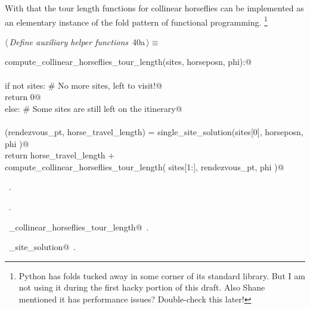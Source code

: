 \documentclass[11.5pt]{report}
\begin{document}
\vspace{-0.8cm}
With that the tour length functions for collinear horseflies can be implemented as 
an elementary instance of the fold pattern of functional programming. 
\footnote{Python has folds tucked away in some corner of its standard library. 
But I am not using it during the first hacky portion of this draft. Also Shane 
mentioned it has performance issues? Double-check this later!}
\begin{flushleft} \small\label{scrap44}\raggedright\small
{} $\langle\,${\itshape Define auxiliary helper functions}\nobreak\ {\footnotesize {40a}}$\,\rangle\equiv$
\vspace{-1ex}
\begin{list}{}{} \item
\mbox{}\verb@def compute_collinear_horseflies_tour_length(sites, horseposn, phi):@\\
\mbox{}\verb@@\\
\mbox{}\verb@     if not sites: # No more sites, left to visit!@\\
\mbox{}\verb@          return 0@\\
\mbox{}\verb@     else:         # Some sites are still left on the itinerary@\\
\mbox{}\verb@@\\
\mbox{}\verb@          (rendezvous_pt, horse_travel_length) = single_site_solution(sites[0], horseposn, phi )@\\
\mbox{}\verb@          return horse_travel_length  + \@\\
\mbox{}\verb@                 compute_collinear_horseflies_tour_length( sites[1:], rendezvous_pt, phi )@\\
\mbox{}\verb@@{\NWsep}
\end{list}
\vspace{-1.5ex}
\footnotesize
\begin{list}{}{\setlength{\itemsep}{-\parsep}\setlength{\itemindent}{-\leftmargin}}
\item \NWtxtMacroDefBy\ .
\item \NWtxtMacroRefIn\ .
\item \NWtxtIdentsDefed\nobreak\  \verb@compute_collinear_horseflies_tour_length@\nobreak\ .\item \NWtxtIdentsUsed\nobreak\  \verb@single_site_solution@\nobreak\ .
\item{}
\end{list}
\vspace{4ex}
\end{flushleft}
\end{document}
